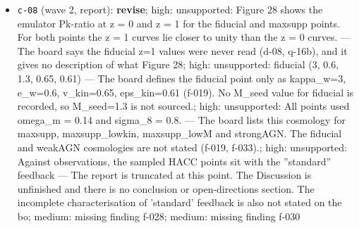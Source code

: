 \documentclass[11pt,a4paper]{article}
\begin{document}
\begin{itemize}
  \item \texttt{c-08} (wave 2, report): \textbf{revise}; high: unsupported: Figure 28 shows the emulator Pk-ratio at z = 0 and z = 1 for the fiducial and maxsupp points. For both points the z = 1 curves lie closer to unity than the z = 0 curves. --- The board says the fiducial z=1 values were never read (d-08, q-16b), and it gives no description of what Figure 28; high: unsupported: fiducial (3, 0.6, 1.3, 0.65, 0.61) --- The board defines the fiducial point only as kappa\_w=3, e\_w=0.6, v\_kin=0.65, eps\_kin=0.61 (f-019). No M\_seed value for fiducial is recorded, so M\_seed=1.3 is not sourced.; high: unsupported: All points used omega\_m = 0.14 and sigma\_8 = 0.8. --- The board lists this cosmology for maxsupp, maxsupp\_lowkin, maxsupp\_lowM and strongAGN. The fiducial and weakAGN cosmologies are not stated (f-019, f-033).; high: unsupported: Against observations, the sampled HACC points sit with the ''standard'' feedback --- The report is truncated at this point. The Discussion is unfinished and there is no conclusion or open-directions section. The incomplete characterisation of 'standard' feedback is also not stated on the bo; medium: missing finding f-028; medium: missing finding f-030
\end{itemize}
\end{document}
